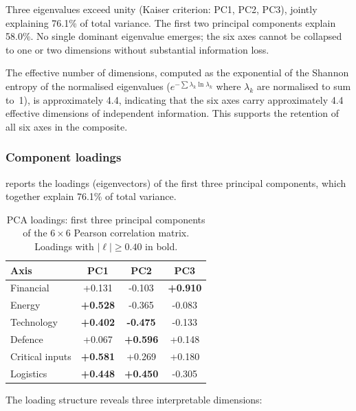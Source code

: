 Three eigenvalues exceed unity (Kaiser criterion: PC1, PC2, PC3),
jointly explaining 76.1\% of total variance.  The first two principal
components explain 58.0\%.  No single dominant eigenvalue emerges;
the six axes cannot be collapsed to one or two
dimensions without substantial information loss.

The effective number of dimensions, computed as the exponential of
the Shannon entropy of the normalised eigenvalues
($e^{-\sum \lambda_k \ln \lambda_k}$ where $\lambda_k$ are
normalised to sum to~1), is approximately 4.4, indicating that the
six axes carry approximately 4.4 effective dimensions of independent
information.  This supports the retention of all six axes in the
composite.

\subsubsection{Component loadings}

 reports the loadings (eigenvectors) of the
first three principal components, which together explain 76.1\% of
total variance.

\begin{table}[htbp]
\centering
\caption{PCA loadings: first three principal components of the
  $6 \times 6$ Pearson correlation matrix.  Loadings with
  $|\ell| \geq 0.40$ in bold.}
\label{tab:pca-loadings}
\small
\setlength{\tabcolsep}{4pt}
\begin{tabular*}{\textwidth}{@{\extracolsep{\fill}} l S S S @{}}
\toprule
\textbf{Axis} & {\textbf{PC1}} & {\textbf{PC2}} & {\textbf{PC3}} \\
\midrule
Financial       & +0.131 & -0.103 & \textbf{+0.910} \\
Energy          & \textbf{+0.528} & -0.365 & -0.083 \\
Technology      & \textbf{+0.402} & \textbf{-0.475} & -0.133 \\
Defence         & +0.067 & \textbf{+0.596} & +0.148 \\
Critical inputs & \textbf{+0.581} & +0.269 & +0.180 \\
Logistics       & \textbf{+0.448} & \textbf{+0.450} & -0.305 \\
\bottomrule
\end{tabular*}
\end{table}

The loading structure reveals three interpretable dimensions:

